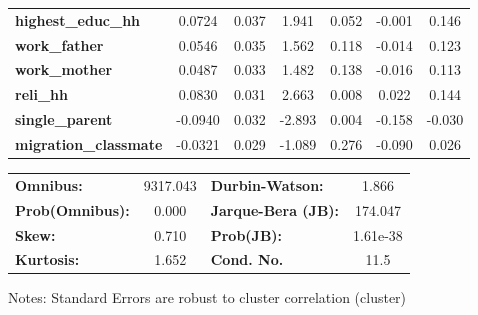 \begin{center}
\begin{tabular}{lcccccc}
\textbf{highest\_educ\_hh}    &       0.0724  &        0.037     &     1.941  &         0.052        &       -0.001    &        0.146     \\
\textbf{work\_father}         &       0.0546  &        0.035     &     1.562  &         0.118        &       -0.014    &        0.123     \\
\textbf{work\_mother}         &       0.0487  &        0.033     &     1.482  &         0.138        &       -0.016    &        0.113     \\
\textbf{reli\_hh}             &       0.0830  &        0.031     &     2.663  &         0.008        &        0.022    &        0.144     \\
\textbf{single\_parent}       &      -0.0940  &        0.032     &    -2.893  &         0.004        &       -0.158    &       -0.030     \\
\textbf{migration\_classmate} &      -0.0321  &        0.029     &    -1.089  &         0.276        &       -0.090    &        0.026     \\
\bottomrule
\end{tabular}
\begin{tabular}{lclc}
\textbf{Omnibus:}       & 9317.043 & \textbf{  Durbin-Watson:     } &    1.866  \\
\textbf{Prob(Omnibus):} &   0.000  & \textbf{  Jarque-Bera (JB):  } &  174.047  \\
\textbf{Skew:}          &   0.710  & \textbf{  Prob(JB):          } & 1.61e-38  \\
\textbf{Kurtosis:}      &   1.652  & \textbf{  Cond. No.          } &     11.5  \\
\bottomrule
\end{tabular}
\end{center}

Notes: \newline
 [1] Standard Errors are robust to cluster correlation (cluster)
